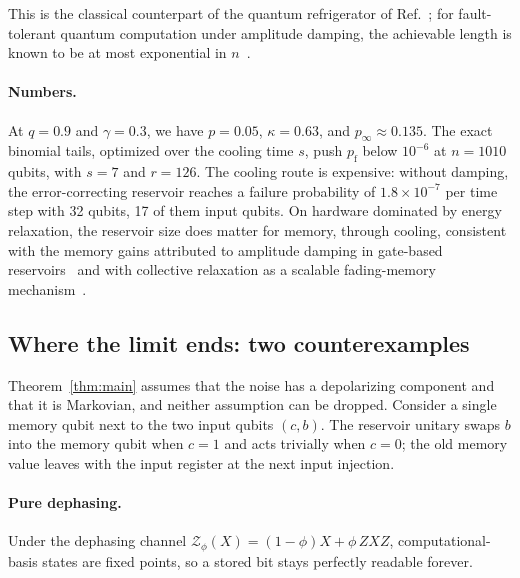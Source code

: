\documentclass[aps,prl,twocolumn,superscriptaddress,floatfix]{revtex4-2}
\theoremstyle{plain}
\begin{document}
This is the classical counterpart of the quantum refrigerator of Ref.~\cite{BenOr2013}; for fault-tolerant quantum computation under amplitude damping, the achievable length is known to be at most exponential in $n$~\cite{Fawzi2022}.

\paragraph*{Numbers.} At $q=0.9$ and $\gamma=0.3$, we have $p=0.05$, $\kappa=0.63$, and $p_\infty\approx0.135$. The exact binomial tails, optimized over the cooling time $s$, push $p_{\mathrm f}$ below $10^{-6}$ at $n=1010$ qubits, with $s=7$ and $r=126$. The cooling route is expensive: without damping, the error-correcting reservoir reaches a failure probability of $1.8\times10^{-7}$ per time step with 32 qubits, 17 of them input qubits. On hardware dominated by energy relaxation, the reservoir size does matter for memory, through cooling, consistent with the memory gains attributed to amplitude damping in gate-based reservoirs~\cite{Monzani2024} and with collective relaxation as a scalable fading-memory mechanism~\cite{Freiheit2026}.

\subsection{Where the limit ends: two counterexamples}
\label{sm:counter}

Theorem~\ref{thm:main} assumes that the noise has a depolarizing component and that it is Markovian, and neither assumption can be dropped. Consider a single memory qubit next to the two input qubits $(c,b)$. The reservoir unitary swaps $b$ into the memory qubit when $c=1$ and acts trivially when $c=0$; the old memory value leaves with the input register at the next input injection.

\paragraph*{Pure dephasing.} Under the dephasing channel $\mathcal Z_\phi(X)=(1-\phi)X+\phi\,ZXZ$, computational-basis states are fixed points, so a stored bit stays perfectly readable forever.
\end{document}
